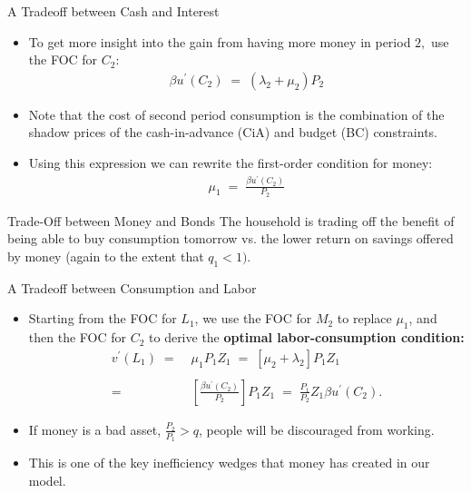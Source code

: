 \documentclass[10pt,c,aspectratio=1610,handout]{beamer}
\begin{document}
\begin{frame}{A Tradeoff between Cash and Interest}%
  \begin{itemize}%
    \item[$\blacktriangleright$] To get more insight into the gain from having more money in period $2,$ use the FOC for $C_{2}$:%
    \begin{align*}%
      \beta u^{\prime} (C_{2}) \; = \; (\lambda_{2} + \mu_{2}) P_{2}%
    \end{align*}%
    \pause%
    \item[$\blacktriangleright$] Note that the cost of second period consumption is the combination of the shadow prices of the cash-in-advance (CiA) and budget (BC) constraints.%
    \item[$\blacktriangleright$] Using this expression we can rewrite the first-order condition for money:%
    \begin{align*}%
      \mu_{1} \; = \; \frac{\beta u^{\prime} (C_{2})}{P_{2}}%
    \end{align*}%
  \end{itemize}%
  \pause%
  \begin{block}{Trade-Off between Money and Bonds}%
    The household is trading off the benefit of being able to buy consumption tomorrow vs. the lower return on savings offered by money (again to the extent that $q_{1}<1).$%
  \end{block}%
\end{frame}%
\begin{frame}{A Tradeoff between Consumption and Labor}%
  \begin{itemize}%
    \item[$\blacktriangleright$] Starting from the FOC for $L_{1}$, we use the FOC for $M_{2}$ to replace $\mu_{1}$, and then the FOC for $C_{2}$ to derive the \textbf{optimal labor-consumption condition:}%
    \begin{align*}%
      v^{\prime} (L_{1}) \; = & \; \mu_{1} P_{1} Z_{1} \; = \; \left[ \mu_{2} + \lambda_{2} \right] P_{1} Z_{1}\\%
      \\%
      = & \; \left[ \frac{\beta u^{\prime} (C_{2})}{P_{2}} \right] P_{1} Z_{1} \; = \; \frac{P_{1}}{P_{2}} Z_{1} \beta u^{\prime}(C_{2}).%
    \end{align*}%
    \pause%
    \item[$\blacktriangleright$] If money is a bad asset, $\frac{P_2}{P_1} > q$, people will be discouraged from working.%
    \pause%
    \item[$\Rightarrow$] This is one of the key inefficiency wedges that money has created in our model.%
  \end{itemize}%
\end{frame}%
\end{document}
